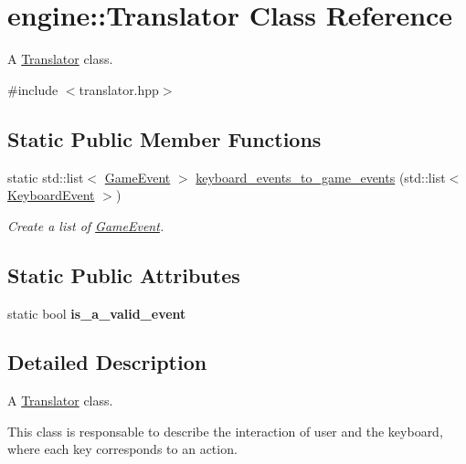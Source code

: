 \hypertarget{classengine_1_1_translator}{}\section{engine\+:\+:Translator Class Reference}
\label{classengine_1_1_translator}


A \hyperlink{classengine_1_1_translator}{Translator} class.  




{\ttfamily \#include $<$translator.\+hpp$>$}

\subsection*{Static Public Member Functions}
\begin{DoxyCompactItemize}
\item 
static std\+::list$<$ \hyperlink{class_game_event}{Game\+Event} $>$ \hyperlink{classengine_1_1_translator_af01485c63cb4b6e16546f526a6c7c18a}{keyboard\+\_\+events\+\_\+to\+\_\+game\+\_\+events} (std\+::list$<$ \hyperlink{classengine_1_1_keyboard_event}{Keyboard\+Event} $>$)
\begin{DoxyCompactList}\small\item\em Create a list of \hyperlink{class_game_event}{Game\+Event}. \end{DoxyCompactList}\end{DoxyCompactItemize}
\subsection*{Static Public Attributes}
\begin{DoxyCompactItemize}
\item 
static bool {\bfseries is\+\_\+a\+\_\+valid\+\_\+event}\hypertarget{classengine_1_1_translator_af5c5dfc421009f711b048cfa95d3f3a5}{}\label{classengine_1_1_translator_af5c5dfc421009f711b048cfa95d3f3a5}

\end{DoxyCompactItemize}


\subsection{Detailed Description}
A \hyperlink{classengine_1_1_translator}{Translator} class. 

This class is responsable to describe the interaction of user and the keyboard, where each key corresponds to an action. 

